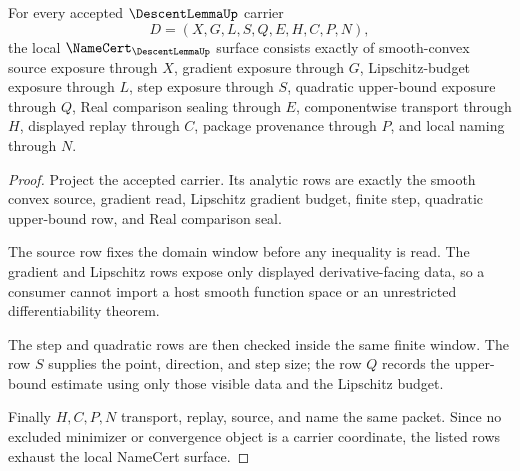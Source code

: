 \begin{theorem}
\label{thm:descent-lemma-namecert-obligations}
For every accepted $\DescentLemmaUp$ carrier
$$
D=(X,G,L,S,Q,E,H,C,P,N),
$$
the local $\NameCert_{\DescentLemmaUp}$ surface consists exactly of smooth-convex source exposure through $X$, gradient exposure through $G$, Lipschitz-budget exposure through $L$, step exposure through $S$, quadratic upper-bound exposure through $Q$, Real comparison sealing through $E$, componentwise transport through $H$, displayed replay through $C$, package provenance through $P$, and local naming through $N$.
\end{theorem}
\begin{proof}
Project the accepted carrier. Its analytic rows are exactly the smooth convex source, gradient read, Lipschitz gradient budget, finite step, quadratic upper-bound row, and Real comparison seal.

The source row fixes the domain window before any inequality is read. The gradient and Lipschitz rows expose only displayed derivative-facing data, so a consumer cannot import a host smooth function space or an unrestricted differentiability theorem.

The step and quadratic rows are then checked inside the same finite window. The row $S$ supplies the point, direction, and step size; the row $Q$ records the upper-bound estimate using only those visible data and the Lipschitz budget.

Finally $H,C,P,N$ transport, replay, source, and name the same packet. Since no excluded minimizer or convergence object is a carrier coordinate, the listed rows exhaust the local NameCert surface.
\end{proof}

